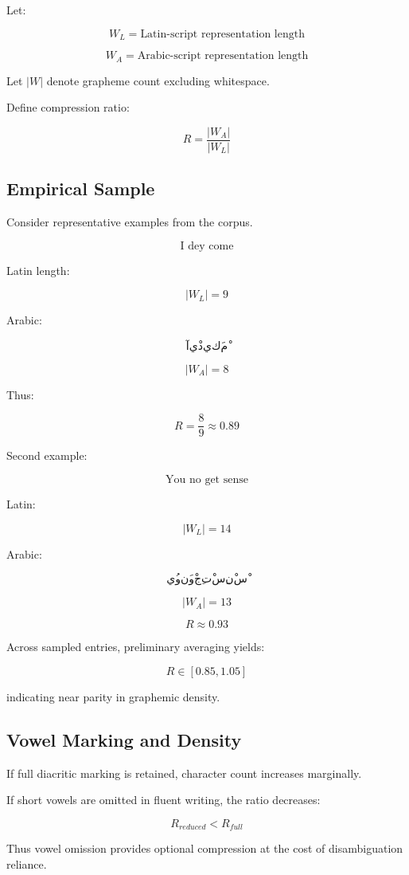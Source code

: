 \documentclass[12pt]{article}
\begin{document}
Let:

\[
W_L = \text{Latin-script representation length}
\]

\[
W_A = \text{Arabic-script representation length}
\]

Let \( |W| \) denote grapheme count excluding whitespace.

Define compression ratio:

\[
R = \frac{|W_A|}{|W_L|}
\]

\subsection{Empirical Sample}

Consider representative examples from the corpus.

\[
\text{I dey come}
\]

Latin length:

\[
|W_L| = 9
\]

Arabic:

\[
آيْ دي كَمْ
\]

\[
|W_A| = 8
\]

Thus:

\[
R = \frac{8}{9} \approx 0.89
\]

Second example:

\[
\text{You no get sense}
\]

Latin:

\[
|W_L| = 14
\]

Arabic:

\[
يُو نَوْ جِتْ سِنْسْ
\]

\[
|W_A| = 13
\]

\[
R \approx 0.93
\]

Across sampled entries, preliminary averaging yields:

\[
R \in [0.85, 1.05]
\]

indicating near parity in graphemic density.

\subsection{Vowel Marking and Density}

If full diacritic marking is retained, character count increases marginally.

If short vowels are omitted in fluent writing, the ratio decreases:

\[
R_{reduced} < R_{full}
\]

Thus vowel omission provides optional compression at the cost of disambiguation reliance.
\end{document}
